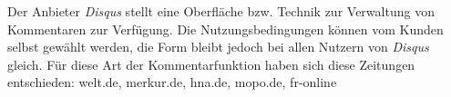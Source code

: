 Der Anbieter {\slshape Disqus} stellt eine Oberfläche bzw. Technik zur Verwaltung von Kommentaren zur Verfügung. 
Die Nutzungsbedingungen können vom Kunden selbst gewählt werden, die Form bleibt jedoch 
bei allen Nutzern von {\slshape Disqus} gleich. Für diese Art der Kommentarfunktion haben sich diese
Zeitungen entschieden: welt.de, merkur.de, hna.de, mopo.de, fr-online












